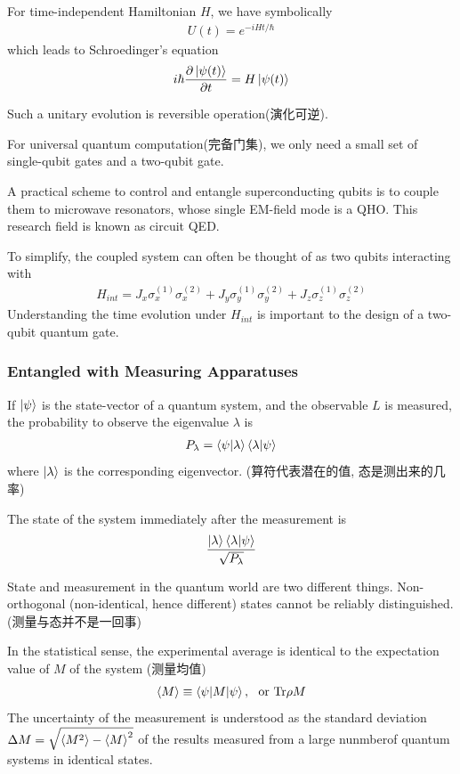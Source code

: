 For time-independent Hamiltonian $H$, we have symbolically
\begin{align*}
    U(t)=e^{-iHt/\hbar}
\end{align*}
which leads to Schroedinger's equation
\begin{align*}
    i\hbar\frac{\partial \ket{\psi(t)}}{\partial t}=H\ket{\psi(t)}
\end{align*}

Such a unitary evolution is reversible operation(演化可逆). 

For universal quantum computation(完备门集), we only need a small set of single-qubit gates and a two-qubit gate. 

A practical scheme to control and entangle superconducting qubits is to couple them to microwave resonators, whose single EM-field mode is a QHO. This research field is known as circuit QED. 

To simplify, the coupled system can often be thought of as two qubits interacting with 
\begin{align*}
    H_{int}=J_x\sigma_x^{(1)}\sigma_x^{(2)}+J_y\sigma_y^{(1)}\sigma_y^{(2)}+J_z\sigma_z^{(1)}\sigma_z^{(2)}
\end{align*}
Understanding the time evolution under $H_{int}$ is important to the design of a two-qubit quantum gate.

\subsubsection{Entangled with Measuring Apparatuses}
If $\ket{\psi}$ is the state-vector of a quantum system, and the observable $L$ is measured, the probability to observe the eigenvalue $\lambda$ is 
\begin{align*}
    P_\lambda=\braket{\psi|\lambda}\braket{\lambda|\psi}
\end{align*}
where $\ket{\lambda}$ is the corresponding eigenvector. (算符代表潜在的值, 态是测出来的几率)

The state of the system immediately after the measurement is 
\begin{align*}
    \frac{\ket{\lambda}\braket{\lambda|\psi}}{\sqrt{P_\lambda}}
\end{align*}

State and measurement in the quantum world are two different things. Non-orthogonal (non-identical, hence different) states cannot be reliably distinguished. (测量与态并不是一回事)

In the statistical sense, the experimental average is identical to the expectation value of $M$ of the system (测量均值)
\begin{align*}
    \braket{M}\equiv \braket{\psi|M|\psi},\ \text{ or }\mathrm{Tr}\rho M
\end{align*}
The uncertainty of the measurement is understood as the standard deviation $\Delta M=\sqrt{\braket{M^2}-\braket{M}^2}$ of the results measured from a large nunmberof quantum systems in identical states. 


